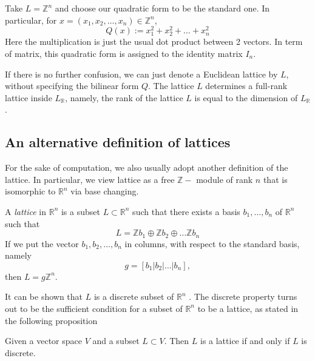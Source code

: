 \begin{example}\label{standard-lattice-zn}
    Take $L = \mathbb{Z}^n$ and choose our quadratic form to be the standard one. In particular, for $x = (x_1,x_2,\ldots,x_n) \in \mathbb{Z}^n$,
    \[Q(x):= x_1^2+x_2^2+\ldots +x_n^2\]
    Here the multiplication is just the usual dot product between 2 vectors. In term of matrix, this quadratic form is assigned to the
    identity matrix $I_n$.
\end{example}
If there is no further confusion, we can just denote a Euclidean lattice by $L$, without specifying the bilinear form
$Q$. The lattice $L$ determines a full-rank lattice inside $L_\mathbb{R}$, namely, the rank
of the lattice $L$ is equal to the dimension of $L_\mathbb{R}$.

\subsection{An alternative definition of lattices}
For the sake of computation, we also usually adopt another definition of the lattice.
In particular, we view lattice as a free $\mathbb{Z}-$ module of rank $n$ that is isomorphic
to $\mathbb{R}^n$ via base changing.
\begin{definition}\label{lattice2}
    A \textit{lattice} in $\mathbb{R}^n$ is a subset $L \subset \mathbb{R}^n$ such that there exists
    a basis $b_1,\ldots,b_n$ of $\mathbb{R}^n$ such that
    \[L = \mathbb{Z}b_1\oplus \mathbb{Z}b_2\oplus \ldots \mathbb{Z}b_n\]
    If we put the vector $b_1,b_2,\ldots,b_n$ in columns, with respect to the standard basis, namely
    \[g = [b_1 | b_2 | \ldots | b_n] ,\]
    then $L = g\mathbb{Z}^n$.
\end{definition}
It can be shown that $L$ is a discrete subset of $\mathbb{R}^n$ . The discrete property turns out to be the sufficient condition for a subset of $\mathbb{R}^n$ to be a lattice, as stated in the
following proposition
\begin{theorem}\cite[Proposition 4.2]{MR1697859}\label{discrete-lattice}
    Given a vector space $V$ and a subset $L \subset V$. Then $L$ is a lattice if and only if $L$ is discrete.
\end{theorem}

